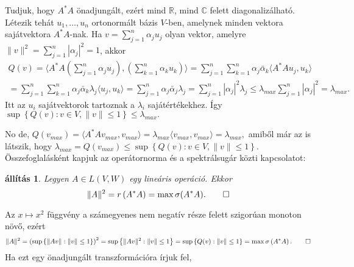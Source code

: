 \documentclass[a4paper, showtrims]{memoir}
\makeatletter
\renewenvironment{proof}[1][\proofname]
    {\par\pushQED{\qed}%
    \normalfont \topsep6\p@\@plus6\p@\relax
    \trivlist
    \item[\hskip\labelsep
        \itshape
    #1\@addpunct{:}]\ignorespaces}
    {\popQED\endtrivlist\@endpefalse}
\theoremstyle{plain}
\newtheorem{proposition}{állítás}[chapter]
\theoremstyle{remark}
\theoremstyle{definition}
\newcommand{\ip}[2]{\langle#1,#2\rangle}
\makeatother
\begin{document}
\begin{proof}
	Tudjuk, hogy $A^\ast A$ önadjungált, ezért mind $\mathbb{R}$, mind $\mathbb{C}$ felett diagonalizálható.
	Létezik tehát $u_1,\ldots,u_n$ ortonormált bázis $V$-ben,
	amelynek minden vektora sajátvektora $A^\ast A$-nak.
	Ha $v=\sum_{j=1}^n\alpha_ju_j$ olyan vektor,
	amelyre $\|v\|^2=\sum_{j=1}^n|\alpha_j|^2=1$,
	akkor
	\begin{multline*}
		Q\left( v \right)
		=
		\ip{A^\ast A\left( \sum_{j=1}^n\alpha_ju_j \right)}{\left( \sum_{k=1}^n\alpha_ku_k \right)}
		=
		\sum_{j=1}^n\sum_{k=1}^n\alpha_j\bar{\alpha}_k\ip{A^\ast Au_j}{u_k}
		\\
		=
		\sum_{j=1}^n\sum_{k=1}^n\alpha_j\bar{\alpha}_k\lambda_j\ip{u_j}{u_k}
		=
		\sum_{j=1}^n\alpha_j\bar{\alpha}_j\lambda_j
		=
		\sum_{j=1}^n|\alpha_j|^2\lambda_j
		\leq
		\lambda_{max}\sum_{j=1}^n|\alpha_j|^2
		=
		\lambda_{max}.
	\end{multline*}
	Itt az $u_i$ sajátvektorok tartoznak a $\lambda_i$ sajátértékekhez.
	Így
	\begin{math}
		\sup\left\{ Q\left( v \right):v\in V,\|v\|\leq 1 \right\}
		\leq
		\lambda_{max}.
	\end{math}

	No de,
	\begin{math}
		Q\left( v_{max} \right)
		=
		\ip{A^\ast Av_{max}}{v_{max}}
		=
		\lambda_{max}\ip{v_{max}}{v_{max}}
		=\lambda_{max},
	\end{math}
	amiből már az is látszik, hogy
	\begin{math}
		\lambda_{max}
		=
		Q\left( v_{max} \right)
		\leq
		\sup\left\{ Q\left( v \right):v\in V,\|v\|\leq 1 \right\}.
	\end{math}
\end{proof}
Összefoglalásként kapjuk az operátornorma és a spektrálsugár közti kapcsolatot:
\begin{proposition}
	Legyen $A\in L\left( V,W \right)$ egy lineáris operáció.
	Ekkor
	\[
		\|A\|^2=r\left( A^\ast A \right)=\max\sigma(A^\ast A).
		\qedhere
	\]
\end{proposition}
\begin{proof}
	Az $x \mapsto x^2$ függvény a számegyenes nem negatív része felett szigorúan monoton növő,
	ezért
	\[
		\|A\|^2
		=
		\left(
		\sup\left\{ \|Av\|:\|v\|\leq 1 \right\}
		\right)^2
		=
		\sup\left\{ \|Av\|^2:\|v\|\leq 1 \right\}
		=
		\sup\left\{ Q(v):\|v\|\leq 1 \right\}
		=
		\max\sigma\left( A^\ast A \right).
		\qedhere
	\]
\end{proof}
Ha ezt egy önadjungált transzformációra írjuk fel,
\end{document}
